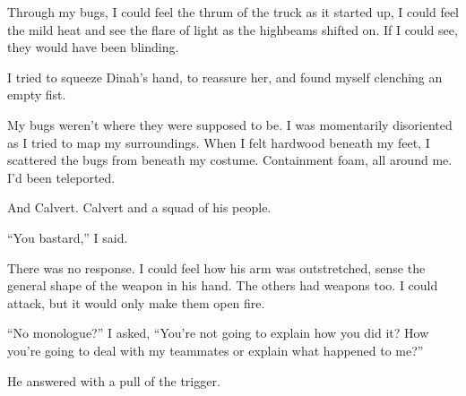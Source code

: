 Through my bugs, I could feel the thrum of the truck as it started up, I could feel the mild heat and see the flare of light as the highbeams shifted on.  If I could see, they would have been blinding.



I tried to squeeze Dinah's hand, to reassure her, and found myself clenching an empty fist.



My bugs weren't where they were supposed to be.  I was momentarily disoriented as I tried to map my surroundings.  When I felt hardwood beneath my feet, I scattered the bugs from beneath my costume.  Containment foam, all around me.  I'd been teleported.



And Calvert.  Calvert and a squad of his people.



``You bastard,'' I said.



There was no response.  I could feel how his arm was outstretched, sense the general shape of the weapon in his hand.  The others had weapons too.  I could attack, but it would only make them open fire.



``No monologue?'' I asked, ``You're not going to explain how you did it?  How you're going to deal with my teammates or explain what happened to me?''



He answered with a pull of the trigger.





